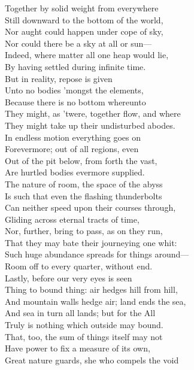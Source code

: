 Together by solid weight from everywhere\\
Still downward to the bottom of the world,\\
Nor aught could happen under cope of sky,\\
Nor could there be a sky at all or sun—\\
Indeed, where matter all one heap would lie,\\
By having settled during infinite time.\\
But in reality, repose is given\\
Unto no bodies 'mongst the elements,\\
Because there is no bottom whereunto\\
They might, as 'twere, together flow, and where\\
They might take up their undisturbed abodes.\\
In endless motion everything goes on\\
Forevermore; out of all regions, even\\
Out of the pit below, from forth the vast,\\
Are hurtled bodies evermore supplied.\\
The nature of room, the space of the abyss\\
Is such that even the flashing thunderbolts\\
Can neither speed upon their courses through,\\
Gliding across eternal tracts of time,\\
Nor, further, bring to pass, as on they run,\\
That they may bate their journeying one whit:\\
Such huge abundance spreads for things around—\\
Room off to every quarter, without end.\\
Lastly, before our very eyes is seen\\
Thing to bound thing: air hedges hill from hill,\\
And mountain walls hedge air; land ends the sea,\\
And sea in turn all lands; but for the All\\
Truly is nothing which outside may bound.\\
That, too, the sum of things itself may not\\
Have power to fix a measure of its own,\\
Great nature guards, she who compels the void\\
